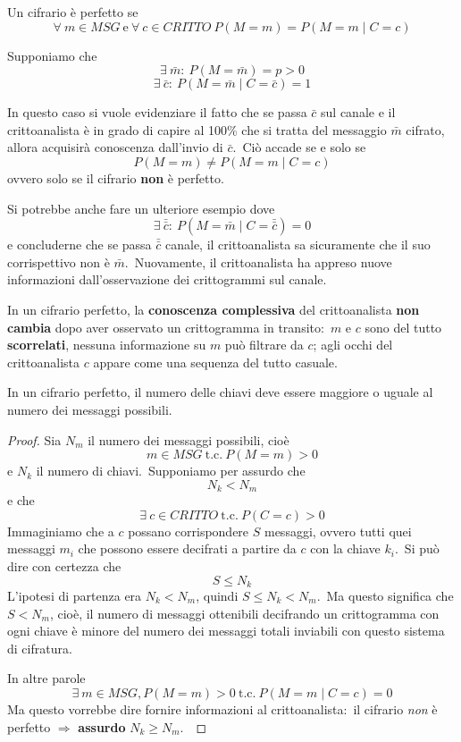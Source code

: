 \vspace{12pt}
Un cifrario è perfetto se
\[\forall\ m \in \mathit{MSG}\ \mathrm{e}\ \forall\ c \in \mathit{CRITTO}\ P(M = m) = P(M = m \mid C = c)\]

\begin{example}

    Supponiamo che
    \[\exists\ \bar{m}:\ P(M=\bar{m})=p>0\]
    \[\exists\ \bar{c}:\ P(M=\bar{m} \mid C = \bar{c}) = 1\]

    \noindent In questo caso si vuole evidenziare il fatto che se passa $\bar{c}$ sul canale e il crittoanalista è in grado di capire al 100\% che si tratta del messaggio $\bar{m}$ cifrato, allora acquisirà conoscenza dall'invio di $\bar{c}$.\
    Ciò accade se e solo se \[P(M = m) \neq P(M = m \mid C = c)\] ovvero solo se il cifrario \textbf{non} è perfetto.

    Si potrebbe anche fare un ulteriore esempio dove \[\exists\ \bar{\bar{c}}:\ P(M = \bar{m} \mid C = \bar{\bar{c}}) = 0\] e concluderne che se passa $\bar{\bar{c}}$ canale, il crittoanalista sa sicuramente che il suo corrispettivo non è $\bar{m}$.\
    Nuovamente, il crittoanalista ha appreso nuove informazioni dall'osservazione dei crittogrammi sul canale.
\end{example}

\noindent In un cifrario perfetto, la \textbf{conoscenza complessiva} del crittoanalista \textbf{non cambia} dopo aver osservato un crittogramma in transito:\ $m$ e $c$ sono del tutto \textbf{scorrelati}, nessuna informazione su $m$ può filtrare da $c$; agli occhi del crittoanalista $c$ appare come una sequenza del tutto casuale.\

\begin{theorem}[Shannon]

    In un cifrario perfetto, il numero delle chiavi deve essere maggiore o uguale al numero dei messaggi possibili.
\end{theorem}

\begin{proof}

    Sia $N_m$ il numero dei messaggi possibili, cioè
    \[m \in \mathit{MSG}\ \mathrm{t.c.}\ P(M=m)>0\]
    e $N_k$ il numero di chiavi.\
    Supponiamo per assurdo che \[N_k<N_m\] e che \[\exists\ c \in \mathit{CRITTO}\ \mathrm{t.c.}\ P(C =c)>0\]
    Immaginiamo che a $c$ possano corrispondere $S$ messaggi, ovvero tutti quei messaggi $m_i$ che possono essere decifrati a partire da $c$ con la chiave $k_i$.\
    Si può dire con certezza che
    \[S \leq N_k\]
    L'ipotesi di partenza era $N_k < N_m$, quindi $S \leq N_k < N_m$.\
    Ma questo significa che $S < N_m$, cioè, il numero di messaggi ottenibili decifrando un crittogramma con ogni chiave è minore del numero dei messaggi totali inviabili con questo sistema di cifratura.\

    In altre parole
    \[\exists\ m \in \mathit{MSG}, P(M = m) > 0\ \mathrm{t.c.}\ P(M = m \mid C = c) = 0\]
    Ma questo vorrebbe dire fornire informazioni al crittoanalista:\ il cifrario \textit{non} è perfetto $\Rightarrow$ \textbf{assurdo} $N_k \geq N_m$.\

\end{proof}

